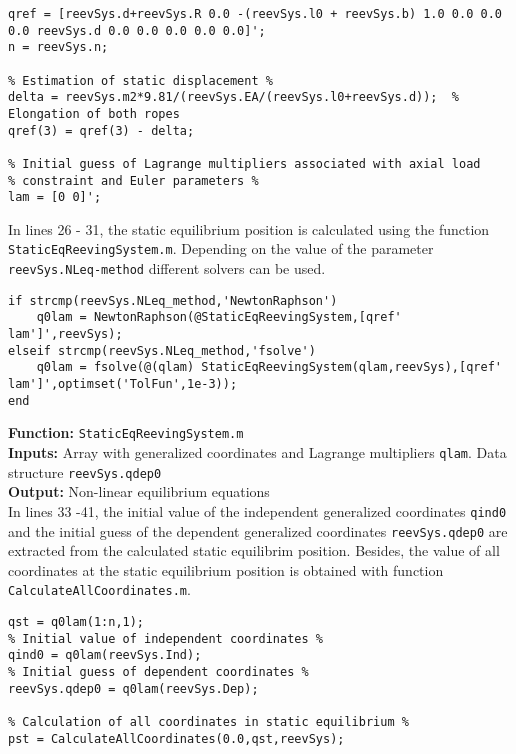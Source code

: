 \begin{tcolorbox}{\begin{lstlisting}[style=Matlab-editor]
% Reference value of coordinates (undeformed configuration) %
qref = [reevSys.d+reevSys.R 0.0 -(reevSys.l0 + reevSys.b) 1.0 0.0 0.0 0.0 reevSys.d 0.0 0.0 0.0 0.0 0.0]';
n = reevSys.n;

% Estimation of static displacement %
delta = reevSys.m2*9.81/(reevSys.EA/(reevSys.l0+reevSys.d));  % Elongation of both ropes
qref(3) = qref(3) - delta;  

% Initial guess of Lagrange multipliers associated with axial load
% constraint and Euler parameters %
lam = [0 0]';
\end{lstlisting}}
\end{tcolorbox}

In lines 26 - 31, the static equilibrium position is calculated using the function \texttt{StaticEqReevingSystem.m}. Depending on the value of the parameter \texttt{reevSys.NLeq-method} different solvers can be used.

\begin{tcolorbox}{\begin{lstlisting}[style=Matlab-editor]
% Calculation of static equilibrium position %
if strcmp(reevSys.NLeq_method,'NewtonRaphson')
    q0lam = NewtonRaphson(@StaticEqReevingSystem,[qref' lam']',reevSys);
elseif strcmp(reevSys.NLeq_method,'fsolve')
    q0lam = fsolve(@(qlam) StaticEqReevingSystem(qlam,reevSys),[qref' lam']',optimset('TolFun',1e-3));
end
\end{lstlisting}}
\end{tcolorbox}

\setlength{\parindent}{0cm}
\textbf{Function:} \texttt{StaticEqReevingSystem.m} \\
\textbf{Inputs:} Array with generalized coordinates and Lagrange multipliers \texttt{qlam}. Data structure \texttt{reevSys.qdep0} \\
\textbf{Output:} Non-linear equilibrium equations \\

In lines 33 -41, the initial value of the independent generalized coordinates \texttt{qind0} and the initial guess of the dependent generalized coordinates \texttt{reevSys.qdep0} are extracted from the calculated static equilibrim position. Besides, the value of all coordinates at the static equilibrium position is obtained with function \texttt{CalculateAllCoordinates.m}.

\begin{tcolorbox}{\begin{lstlisting}[style=Matlab-editor]
% Generalized coordinates in static equilibrium %
qst = q0lam(1:n,1);
% Initial value of independent coordinates %
qind0 = q0lam(reevSys.Ind);
% Initial guess of dependent coordinates %
reevSys.qdep0 = q0lam(reevSys.Dep);

% Calculation of all coordinates in static equilibrium %
pst = CalculateAllCoordinates(0.0,qst,reevSys);
\end{lstlisting}}
\end{tcolorbox}

